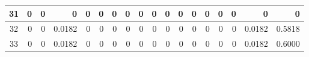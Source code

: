 \begin{table}[ht]
\begin{adjustbox}{width = \textwidth, center}
\begin{tabular}{|c|r|r|r|r|r|r|r|r|r|r|r|r|r|r|r|r|r|}
            \rowcolor[HTML]{FFFFFF} 
            \cellcolor[HTML]{CFE2F3}31                           & 0                                              & 0                                              & 0                                              & 0                                              & 0                                              & 0                                              & 0                                              & 0                                               & 0                                               & 0                                               & 0                                               & 0                                               & 0                                               & 0                                               & 0                                               & \cellcolor[HTML]{D9D2E9}0                                                             & \cellcolor[HTML]{D9D2E9}0                                                                 \\ \hline
            \rowcolor[HTML]{FFFFFF} 
            \cellcolor[HTML]{CFE2F3}32                           & 0                                              & 0                                              & \cellcolor[HTML]{C7E9D8}0.0182                 & 0                                              & 0                                              & 0                                              & 0                                              & 0                                               & 0                                               & 0                                               & 0                                               & 0                                               & 0                                               & 0                                               & 0                                               & \cellcolor[HTML]{D9D2E9}0.0182                                                        & \cellcolor[HTML]{D9D2E9}0.5818                                                            \\ \hline
            \rowcolor[HTML]{FFFFFF} 
            \cellcolor[HTML]{CFE2F3}33                           & 0                                              & 0                                              & \cellcolor[HTML]{C7E9D8}0.0182                 & 0                                              & 0                                              & 0                                              & 0                                              & 0                                               & 0                                               & 0                                               & 0                                               & 0                                               & 0                                               & 0                                               & 0                                               & \cellcolor[HTML]{D9D2E9}0.0182                                                        & \cellcolor[HTML]{D9D2E9}0.6000                                                            \\ \hline

\end{tabular}
\end{adjustbox}
\end{table}
